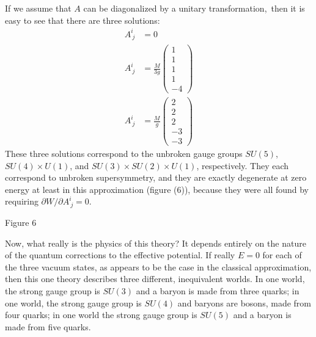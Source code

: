 If we assume that $A$ can be diagonalized by a unitary transformation,\begingroup\renewcommand{\thefootnote}{\fnsymbol{footnote}}\footnotemark[1]\endgroup\ then it is easy to see that there are three solutions:
\begin{equation}
\begin{aligned}
A^i_{\ j} &= 0 \\
A^i_{\ j} &= \frac{M}{3g}
\left(
\begin{array}{r}
1 \\
1 \\
1 \\
1 \\
-4
\end{array}
\right) \\
A^i_{\ j} &= \frac{M}{g}
\left(
\begin{array}{r}
2 \\
2 \\
2 \\
-3 \\
-3
\end{array}
\right)
\end{aligned}
\tag{27}
\end{equation}
These three solutions correspond to the unbroken gauge groups $SU(5)$,
$SU(4) \times U(1)$, and $SU(3) \times SU(2) \times U(1)$, respectively. They each
correspond to unbroken supersymmetry, and they are exactly degenerate
at zero energy at least in this approximation (figure (6)), because
they were all found by requiring $\partial W/\partial A^i_{\ j} = 0$.

\begingroup
\renewcommand{\thefootnote}{\fnsymbol{footnote}}
\endgroup

\begin{center}
\par\smallskip
Figure 6
\end{center}

Now, what really is the physics of this theory? It depends
entirely on the nature of the quantum corrections to the effective
potential. If really $E = 0$ for each of the three vacuum states, as
appears to be the case in the classical approximation, then this one
theory describes three different, inequivalent worlds. In one world,
the strong gauge group is $SU(3)$ and a baryon is made from three
quarks; in one world, the strong gauge group is $SU(4)$ and baryons are
bosons, made from four quarks; in one world the strong gauge group is
$SU(5)$ and a baryon is made from five quarks.

